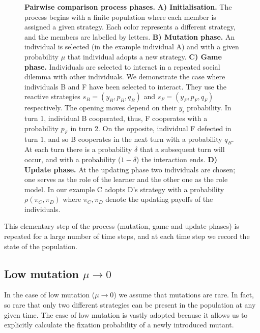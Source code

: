 \documentclass[11pt]{article}
\theoremstyle{plainCl1}
\theoremstyle{plainCl2}
\begin{document}
\begin{figure}[!htbp]
    \centering
    
    \caption{\textbf{Pairwise comparison process phases.} \textbf{A) Initialisation.} The process begins
    with a finite population where each member is assigned a given strategy.
    Each color represents a different strategy, and the members are labelled by
    letters. \textbf{B) Mutation phase.} An individual is selected (in the
    example individual A) and with a given probability \(\mu\) that individual
    adopts a new strategy. \textbf{C) Game phase.} Individuals are
    selected to interact in a repeated social dilemma with other individuals. We
    demonstrate the case where individuals B and F have been selected to
    interact. They use the reactive strategies \(s_{B} = (y_B, p_B, q_B)\) and
    \(s_{F} = (y_F, p_F, q_F)\) respectively. The opening moves depend on their
    \(y_i\) probability. In turn 1, individual B cooperated,
    thus, F cooperates with a probability \(p_{F}\) in turn 2. On the opposite,
    individual F defected in turn 1, and so B cooperates in the next turn with
    a probability \(q_{B}\). At each turn there is a probability \(\delta\) that a
    subsequent turn will occur, and with a probability (\(1- \delta\)) the interaction ends.
    \textbf{D) Update phase.} At the updating phase two individuals are chosen;
    one serves as the role of the learner and the other one as the 
    role model. In our example C adopts D's strategy with a probability
    \(\rho(\pi_{C}, \pi_{D})\) where \(\pi_{C}, \pi_{D}\) denote the updating
    payoffs of the individuals.}\label{fig:pairwise_phases}
\end{figure}

This elementary step of the process (mutation, game and update phases) is
repeated for a large number of time steps, and at each time step we record the
state of the population.

\subsection{Low mutation \(\mu \rightarrow 0\)}

In the case of low mutation (\(\mu \rightarrow 0\)) we assume that mutations are
rare. In fact, so rare that only two different strategies can be present in the
population at any given time. The case of low mutation is vastly adopted because
it allows us to explicitly calculate the fixation probability of a newly
introduced mutant.
\end{document}
